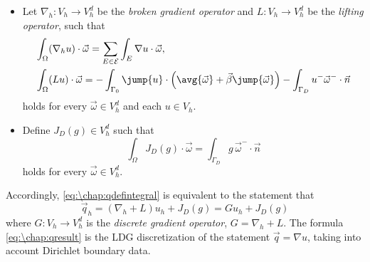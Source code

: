 \begin{itemize}[itemsep=0.5em]
\item Let $\nabla_h : V_h \to V_h^d$ be the \emph{broken gradient operator} and $L : V_h \to V_h^d$ be the \emph{lifting operator}, such that
\begin{align*}
&\int_\Omega (\nabla_h u) \cdot \vec{\omega} = \sum_{E \in \mathcal E} \int_E \nabla u \cdot \vec \omega, \\
&\int_\Omega (Lu) \cdot \vec{\omega} = -\int_{\Gamma_0} \jump{u} \cdot \left(\avg{\vec{\omega}} + \vec{\beta} \jump{\vec{\omega}}\right) - \int_{\Gamma_D} u^- \vec{\omega}^- \cdot \vec{n}
\end{align*}
holds for every $\vec \omega \in V_h^d$ and each $u \in V_h$.
\item Define $J_D(g) \in V_h^d$ such that
\[
\int_\Omega J_D(g) \cdot \vec{\omega} = \int_{\Gamma_D} g\,\vec{\omega}^- \cdot \vec{n}
\]
holds for every $\vec{\omega} \in V_h^d$.
\end{itemize}
Accordingly, \cref{eq:\chap:qdefintegral} is equivalent to the statement that
\begin{equation}\label{eq:\chap:qresult}
\vec{q}_h = (\nabla_h + L)u_h + J_D(g) = G u_h + J_D(g)
\end{equation}
where $G : V_h \to V_h^d$ is the \emph{discrete gradient operator}, $G = \nabla_h + L$. The formula \cref{eq:\chap:qresult} is the LDG discretization of the statement $\vec q = \nabla u$, taking into account Dirichlet boundary data.

